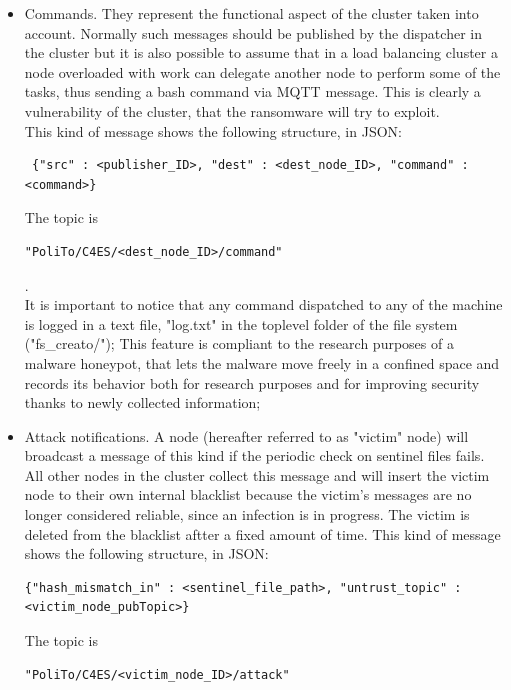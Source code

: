 \begin{itemize}
  \item Commands. They represent the functional aspect of the cluster taken into account. Normally such messages should be published by the dispatcher in the cluster but it is also possible to assume that in a load balancing cluster a node overloaded with work can delegate another node to perform some of the tasks, thus sending a bash command via MQTT message. This is clearly a vulnerability of the cluster, that the ransomware will try to exploit.\\
This kind of message shows the following structure, in JSON: \\ \begin{verbatim} {"src" : <publisher_ID>, "dest" : <dest_node_ID>, "command" : <command>}  \end{verbatim}
The topic is \begin{verbatim}"PoliTo/C4ES/<dest_node_ID>/command"\end{verbatim}.\\
It is important to notice that any command dispatched to any of the machine is logged in a text file, "log.txt" in the toplevel folder of the file system ("fs\_creato/");
This feature is compliant to the research purposes of a malware honeypot, that lets the malware move freely in a confined space and records its behavior both for research purposes and for improving security thanks to newly collected information;
  \item Attack notifications. A node (hereafter referred to as "victim" node) will broadcast a message of this kind if the periodic check on sentinel files fails. All other nodes in the cluster collect this message and will insert the victim node to their own internal blacklist because the victim's messages are no longer considered reliable, since an infection is in progress. The victim is deleted from the blacklist aftter a fixed amount of time.
This kind of message shows the following structure, in JSON:\\ \begin{verbatim}{"hash_mismatch_in" : <sentinel_file_path>, "untrust_topic" : <victim_node_pubTopic>}\end{verbatim}
 The topic is \begin{verbatim}"PoliTo/C4ES/<victim_node_ID>/attack"\end{verbatim}
\end{itemize}


